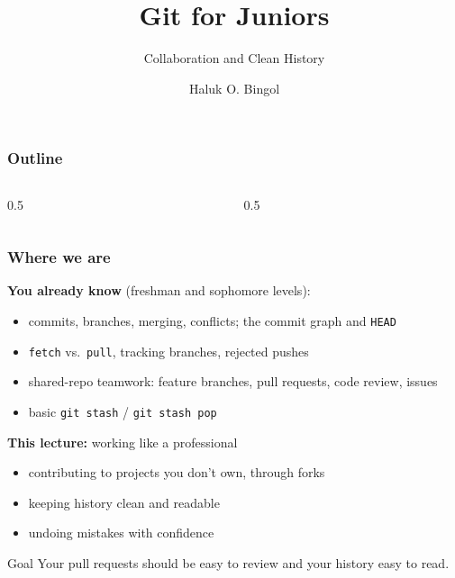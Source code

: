 \documentclass[aspectratio=169,10pt,compress]{beamer}
\title{Git for Juniors}
\subtitle{Collaboration and Clean History}
\author[Bingol]{Haluk O. Bingol}
\institute[FCIS]{
    Faculty of Computer and Information Sciences\\
    Yeditepe University
}
\date{}
\newcommand{\cmd}[1]{\texttt{\color{gitred}#1}}
\begin{document}
\begin{frame}[t,fragile]
  \titlepage
\end{frame}

\begin{frame}[t,fragile] \frametitle{Outline}
  \begin{columns}[T]
    \begin{column}{0.5\textwidth}
      \tableofcontents[sections={1-5}]
    \end{column}
    \begin{column}{0.5\textwidth}
      \tableofcontents[sections={6-11}]
    \end{column}
  \end{columns}
\end{frame}

\begin{frame}[t,fragile] \frametitle{Where we are}
  \textbf{You already know} (freshman and sophomore levels):
  \begin{itemize}
    \item commits, branches, merging, conflicts; the commit graph and \texttt{HEAD}
    \item \cmd{fetch} vs.\ \cmd{pull}, tracking branches, rejected pushes
    \item shared-repo teamwork: feature branches, pull requests, code review, issues
    \item basic \cmd{git stash} / \cmd{git stash pop}
  \end{itemize}

  \vspace{0.5em}
  \textbf{This lecture:} working like a professional
  \begin{itemize}
    \item contributing to projects you don't own, through forks
    \item keeping history clean and readable
    \item undoing mistakes with confidence
  \end{itemize}

  \vspace{0.5em}
  \begin{block}{Goal}
    Your pull requests should be easy to review and your history easy to read.
  \end{block}
\end{frame}
\end{document}
